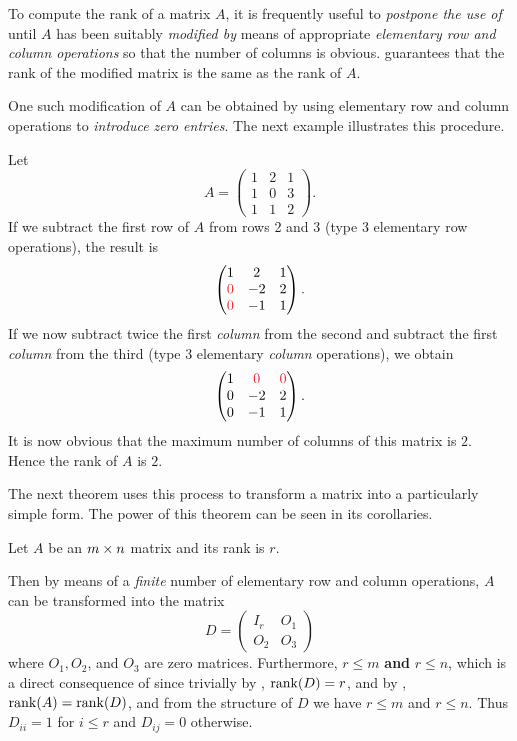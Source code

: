 \begin{remark} \label{remark 3.2.4}
To compute the rank of a matrix \(A\), it is frequently useful to \emph{postpone the use of } until \(A\) has been suitably \emph{modified by} means of appropriate \emph{elementary row and column operations} so that the number of \LID{} columns is obvious.
 guarantees that the rank of the modified matrix is the same as the rank of \(A\).

One such modification of \(A\) can be obtained by using elementary row and column operations to \emph{introduce zero entries}.
The next example illustrates this procedure.
\end{remark}

\begin{example} \label{example 3.2.2}
Let
\[
    A = \begin{pmatrix} 1 & 2 & 1 \\ 1 & 0 & 3 \\ 1 & 1 & 2 \end{pmatrix}.
\]
If we subtract the first row of \(A\) from rows 2 and 3 (type 3 elementary row operations), the result is
\[
    \begin{pmatrix} 1 & 2 & 1 \\ \RED{0} & -2 & 2 \\ \RED{0} & -1 & 1 \end{pmatrix}.
\]
If we now subtract twice the first \emph{column} from the second and subtract the first \emph{column} from the third (type 3 elementary \emph{column} operations), we obtain
\[
    \begin{pmatrix} 1 & \RED{0} & \RED{0} \\ 0 & -2 & 2 \\ 0 & -1 & 1 \end{pmatrix}.
\]
It is now obvious that the maximum number of \LID{} columns of this matrix is \(2\).
Hence the rank of \(A\) is \(2\).
\end{example}

The next theorem uses this process to transform a matrix into a particularly simple form.
The power of this theorem can be seen in its corollaries.

\begin{theorem} \label{thm 3.6}
Let \(A\) be an \(m \times n\) matrix and its rank is \(r\).

 Then by means of a \emph{finite} number of elementary row and column operations, \(A\) can be transformed into the matrix
\[
    D = \begin{pmatrix} I_r & O_1 \\ O_2 & O_3 \end{pmatrix}
\]
where \(O_1, O_2\), and \(O_3\) are zero matrices.
Furthermore, \(r \le m\) \textbf{and} \(r \le n\), which is a direct consequence of  since trivially by , \(\mathrm{rank}(D) = r\), and by , \(\mathrm{rank}(A) = \mathrm{rank}(D)\), and from the structure of \(D\) we have \(r \le m\) and \(r \le n\).
Thus \(D_{ii} = 1\) for \(i \le r\) and \(D_{ij} = 0\) otherwise.
\end{theorem}

